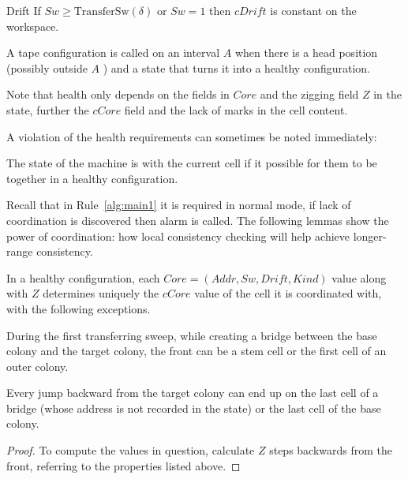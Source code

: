 \documentclass[12pt]{memoir}
\newcommand{\authnote}[3]
{\text{{ \textcolor{#3}{\( \langle\hspace{-0.2em}\langle \)\textsf{\footnotesize #1: #2}\( \rangle\hspace{-0.2em}\rangle \)}}}}
\newcommand{\authnote}[2]{}
\newcommand{\Pnote}[1]{{\authnote{Peter}{#1}{cyan}}}
\newcommand{\fld}[1]{\ensuremath{\textit{#1}}}
\newcommand{\Z}{Z}
\newcommand{\Addr}{\fld{Addr}}
\newcommand{\Core}{\fld{Core}}
\newcommand{\cCore}{\fld{cCore}}
\newcommand{\Drift}{\fld{Drift}}
\newcommand{\cDrift}{\fld{cDrift}}
\newcommand{\Info}{\fld{Info}}
\newcommand{\Kind}{\fld{Kind}}
\newcommand{\State}{\fld{State}}
\newcommand{\Sweep}{\fld{Sw}}
\newcommand{\TransferSw}{\mathrm{TransferSw}}
\begin{document}
\begin{definition}
\begin{flushdescription}





        \item[Drift]%
         If \( \Sweep \ge \TransferSw(\delta) \) or \( \Sweep=1 \) then \( \cDrift \)
         is constant on the workspace.

   \end{flushdescription}

A tape configuration is called  on an interval \( A \)
when there is a head position (possibly outside \( A \) ) and a 
state that turns it into a healthy configuration.
 \end{definition}

Note that health only depends on the fields in \( \Core \) and
the zigging field \( \Z \) in the state, further the  \( \cCore \) field
and the lack of marks in the cell content.

A violation of the health requirements can sometimes be noted immediately:

\begin{definition}[Coordination] \label{def:coordinated}
   The state of the machine is  with the current cell
   if it possible for them to be together in a healthy configuration.
\end{definition}

Recall that in Rule~\ref{alg:main1} it is required in normal mode,
if lack of coordination is discovered then alarm is called.
The  following lemmas show the power of coordination:
how local consistency checking will help achieve longer-range consistency.

\begin{lemma}\label{lem:coordination1}
  In a healthy configuration, each \( \Core =(\Addr, \Sweep, \Drift, \Kind) \) 
  value along with \( \Z \) determines uniquely the 
  \( \cCore \) value of the cell it is coordinated with, with the following exceptions.
  \begin{bullets}
  \item During the first transferring sweep, while
    creating a bridge between the base colony and the target colony, 
    the front can be a stem cell or the first cell of an outer colony.
  \item Every jump backward from the target colony can end up on the last cell of a 
    bridge (whose address is not recorded in the state) or the last cell of the base colony.
  \end{bullets}
  \end{lemma}
  \begin{proof}
  To compute the values in question, calculate \( \Z \) steps backwards from the front,
  referring to the properties listed above.
\Pnote{Elaborate!}    
  \end{proof}
\end{document}
